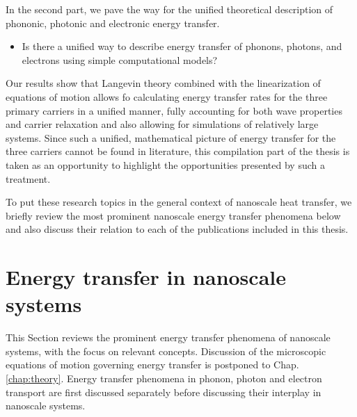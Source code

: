 In the second part, we pave the way for the unified theoretical description of phononic, photonic and electronic energy transfer.
\begin{itemize}
 \item Is there a unified way to describe energy transfer of phonons, photons, and electrons using simple computational models?
\end{itemize}
Our results show that Langevin theory \cite{langevin,zwanzig} combined with the linearization of equations of motion allows fo calculating energy transfer rates for the three primary carriers in a unified manner, fully accounting for both wave properties and carrier relaxation and also allowing for simulations of relatively large systems. Since such a unified, mathematical picture of energy transfer for the three carriers cannot be found in literature, this compilation part of the thesis is taken as an opportunity to highlight the opportunities presented by such a treatment.


To put these research topics in the general context of nanoscale heat transfer, we briefly review the most prominent nanoscale energy transfer phenomena below and also discuss their relation to each of the publications included in this thesis. 




\section{Energy transfer in nanoscale systems}
This Section reviews the prominent energy transfer phenomena of nanoscale systems, with the focus on relevant concepts. Discussion of the microscopic equations of motion governing energy transfer is postponed to Chap. \ref{chap:theory}. Energy transfer phenomena in phonon, photon and electron transport are first discussed separately before discussing their interplay in nanoscale systems.

